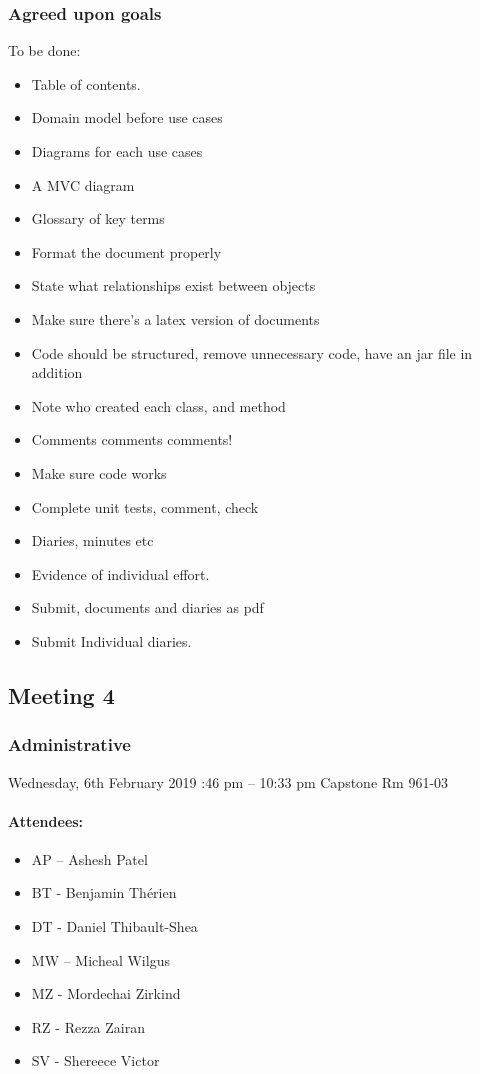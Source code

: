 \documentclass[10pt, a4paper]{article}
\begin{document}
			\subsubsection{Agreed upon goals}
			To be done: 
			\begin{itemize}
				\item Table of contents.
				\item Domain model before use cases 
				\item Diagrams for each use cases
				\item A MVC diagram 
				\item Glossary of key terms 
				\item Format the document properly 
				\item State what relationships exist between objects
				\item Make sure there's a latex version of documents 
				\item Code should be structured, remove unnecessary code, have an jar file in addition
				\item Note who created each class, and method 
				\item Comments comments comments!
				\item Make sure code works
				\item Complete unit tests, comment, check 
				\item Diaries, minutes etc
				\item Evidence of individual effort. 
				\item Submit, documents and diaries as pdf 
				\item Submit Individual diaries.
				
			\end{itemize}
			\pagebreak
			
			\subsection{Meeting 4}
			
			\subsubsection{Administrative}
			Wednesday, 6th February 2019 :46 pm – 10:33 pm \textbar Capstone Rm 961-03
			\paragraph{Attendees:}
			
			\begin{itemize}
				\item AP – Ashesh Patel
				\item BT - Benjamin Th\'erien
				\item DT - Daniel Thibault-Shea
				\item MW – Micheal Wilgus
				\item MZ - Mordechai Zirkind  
				\item RZ - Rezza Zairan 
				\item SV - Shereece Victor 
			\end{itemize}
			
\end{document}
